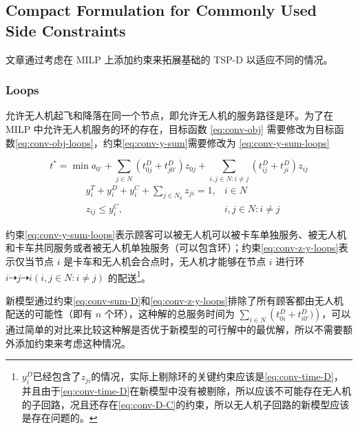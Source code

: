 \documentclass[fontset=none]{ctexart}
\begin{document}
\subsection{Compact Formulation for Commonly Used Side Constraints}
文章通过考虑在 MILP 上添加约束来拓展基础的 TSP-D 以适应不同的情况。

\subsubsection{Loops}
允许无人机起飞和降落在同一个节点，即允许无人机的服务路径是环。为了在 MILP 中允许无人机服务的环的存在，目标函数 \cref{eq:conv-obj} 需要修改为目标函数\cref{eq:conv-obj-loops}，约束\cref{eq:conv-y-sum}需要修改为 \cref{eq:conv-y-sum-loops}

\begin{lemma}
    \begin{equation}
        t^* = \min a_{0'} + \sum_{j \in N}\left(t_{0j}^D + t_{j0'}^D\right)z_{0j} + \sum_{i, j \in N: i\neq j}\left(t_{ij}^D + t_{ji}^D\right)z_{ij} \tag{2} \label{eq:conv-obj-loops}
    \end{equation}
    \begin{align}
        & y_i^T + y_i^D + y_i^C + \sum_{j \in N_0} z_{ji} = 1, & i \in N \tag{3a}\label{eq:conv-y-sum-loops} \\
        & z_{ij} \leq y_i^C, & i,j \in N: i \neq j \tag{3b}\label{eq:conv-z-y-loops}
    \end{align} 
\end{lemma}

约束\cref{eq:conv-y-sum-loops}表示顾客可以被无人机可以被卡车单独服务、被无人机和卡车共同服务或者被无人机单独服务（可以包含环）；约束\cref{eq:conv-z-y-loops}表示仅当节点 $i$ 是卡车和无人机会合点时，无人机才能够在节点 $i$ 进行环 $i \dashrightarrow j \dashrightarrow i (i, j \in N: i \neq j)$ 的配送\footnote{$y_i^D$已经包含了$z_{ji}$的情况，实际上剔除环的关键约束应该是\cref{eq:conv-time-D}，并且由于\cref{eq:conv-time-D}在新模型中没有被剔除，所以应该不可能存在无人机的子回路，况且还存在\cref{eq:conv-D-C}的约束，所以无人机子回路的新模型应该是存在问题的。}。 

新模型通过约束\cref{eq:conv-sum-D}和\cref{eq:conv-z-y-loops}排除了所有顾客都由无人机配送的可能性（即有 $n$ 个环），这种解的总服务时间为 $\sum_{i \in N}\left(t_{0i}^D + t_{i0'}^D)\right)$，可以通过简单的对比来比较这种解是否优于新模型的可行解中的最优解，所以不需要额外添加约束来考虑这种情况。
\end{document}
